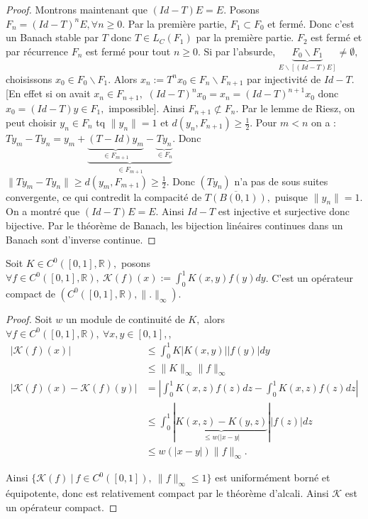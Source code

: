 \begin{proof}
Montrons maintenant que $(Id-T)E=E.$ Posons $F_n=\left( Id-T \right) ^nE,\forall n\ge 0. $ Par la première partie, $F_1\subset F_0$ et fermé. Donc c'est un Banach stable par $T$ donc $T\in L_C(F_1)$ par la première partie. $F_2$ est fermé et par récurrence $F_n$ est fermé pour tout $n\ge 0.$ Si par l'absurde, $\underbrace{F_0\backslash F_1}_{E\backslash [(Id-T)E]}\neq \emptyset ,$ choisissons $x_0\in F_0\backslash F_1$. Alors $x_n:=T^nx_0\in F_n\backslash F_{n+1}$ par injectivité de $Id-T.$ [En effet si on avait $x_n\in F_{n+1},$ $\left( Id-T \right) ^nx_0=x_n=\left( Id-T \right) ^{n+1}x_0$ donc $x_0=(Id-T)y\in F_1,$ impossible]. Ainsi $F_{n+1}\not\subset F_n.$ Par le lemme de Riesz, on peut choisir $y_n\in F_n$ tq $\|y_n\|=1$ et $d(y_n,F_{n+1})\ge \frac{1}{2}.$ Pour $m<n$ on a : $Ty_m-Ty_n =y_m+\underbrace{\underbrace{(T-Id)y_m}_{\in F_{m+1}}-\underbrace{Ty_n}_{\in F_n}}_{\in F_{m+1}}$. Donc $\|Ty_m-Ty_n\|\ge d(y_m,F_{m+1})\ge \frac{1}{2}.$ Donc $(Ty_n)$ n'a pas de sous suites convergente, ce qui contredit la compacité de $\overline{T(B(0,1))},$ puisque $\|y_n\|=1.$  \\
On a montré que $(Id-T)E=E.$ Ainsi $Id-T$ est injective et surjective donc bijective. Par le théorème de Banach, les bijection linéaires continues dans un Banach sont d'inverse continue.
\end{proof}
\begin{lemme}
    Soit $K\in C^0([0,1],\mathbb{R} ),$ posons $\forall f\in C^0([0,1],\mathbb{R} ),\ \mathcal{K}(f)(x):=\int_0^1K(x,y)f(y)dy$. C'est un opérateur compact de  $(C^0([0,1],\mathbb{R} ),\|.\|_\infty )$.
\end{lemme}
\begin{proof}
    Soit $w$ un module de continuité de $K,$ alors $\forall f\in C^0([0,1],\mathbb{R} ),\ \forall x,y\in [0,1], $,
    \begin{align*}
        |\mathcal{K}(f)(x)| &\le \int_{0}^{1} K|K(x,y)| |f(y)| dy \\
        &\le \|K\|_\infty \|f\|_\infty \\
        |\mathcal{K}(f)(x)-\mathcal{K}(f)(y)| &= |\int_{0}^{1} K(x,z)f(z)dz-\int_{0}^{1} K(x,z)f(z)dz  | \\
                                              &\le \int_{0}^{1} |\underbrace{K(x,z)-K(y,z)}_{\le w(|x-y| }||f(z)| dz\\
                                              &\le w(|x-y| )\|f\|_\infty
    .\end{align*}

    Ainsi $\{\mathcal{K}(f)\ |\ f\in C^0([0,1]),\ \|f\|_\infty \le 1\} $ est uniformément borné et équipotente, donc est relativement compact par le théorème d'alcali. Ainsi $\mathcal{K}$ est un opérateur compact.
\end{proof}
